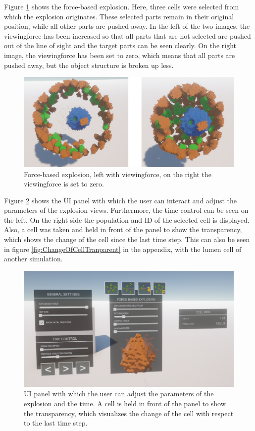 Figure \ref{fig:ForceBasedExplosionPicture} shows the force-based explosion. Here, three cells were selected from which the explosion originates. These selected parts remain in their original position, while all other parts are pushed away.
In the left of the two images, the viewingforce has been increased so that all parts that are not selected are pushed out of the line of sight and the target parts can be seen clearly.     
On the right image, the viewingforce has been set to zero, which means that all parts are pushed away, but the object structure is broken up less.
\begin{figure}[t]
	\centering
	\includegraphics[width=1\linewidth]{fig/Images/ForceBasedExplosionPicture}
	\caption[]{Force-based explosion, left with viewingforce, on the right the viewingforce is set to zero. }
	\label{fig:ForceBasedExplosionPicture}
\end{figure}
Figure \ref{fig:TransparencyAndUI} shows the UI panel with which the user can interact and adjust the parameters of the explosion views. Furthermore, the time control can be seen on the left. On the right side the population and ID of the selected cell is displayed.  
Also, a cell was taken and held in front of the panel to show the transparency, which shows the change of the cell since the last time step. This can also be seen in figure \ref{fig:ChangeOfCellTranparent} in the appendix, with the lumen cell of another simulation. 
\begin{figure}[h]
	\centering
	\includegraphics[width=1\linewidth]{fig/Images/TransparencyAndUI}
	\caption[]{UI panel with which the user can adjust the parameters of the explosion and the time. A cell is held in front of the panel to show the transparency, which visualizes the change of the cell with respect to the last time step. }
	\label{fig:TransparencyAndUI}
\end{figure}













